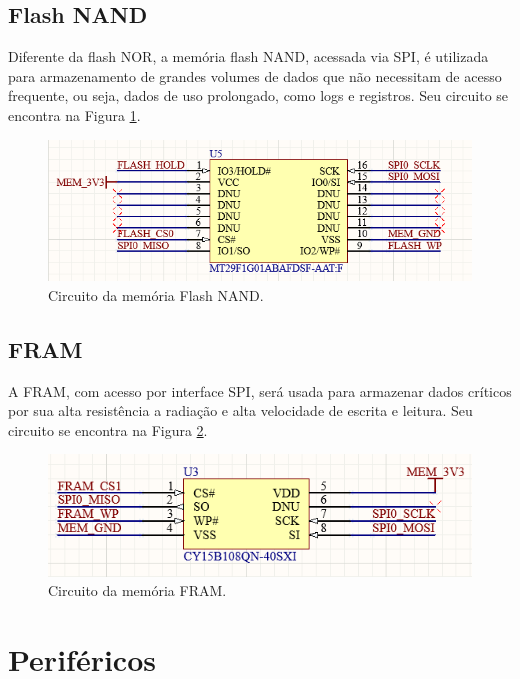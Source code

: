 \subsection{Flash NAND}

Diferente da flash NOR, a memória flash NAND, acessada via SPI, é utilizada para armazenamento de grandes volumes de dados que não necessitam de acesso frequente, ou seja, dados de uso prolongado, como logs e registros. Seu circuito se encontra na Figura \ref{fig:fnand}.

\begin{figure}[H]
    \centering
    \includegraphics[scale=0.7]{images/flash nand.png}
    \caption{Circuito da memória Flash NAND.}
    \label{fig:fnand}
\end{figure}

\subsection{FRAM}

 A FRAM, com acesso por interface SPI, será usada para armazenar dados críticos por sua alta resistência a radiação e alta velocidade de escrita e leitura. Seu circuito se encontra na Figura \ref{fig:fram}.

\begin{figure}[H]
    \centering
    \includegraphics[scale=0.7]{images/fram.png}
    \caption{Circuito da memória FRAM.}
    \label{fig:fram}
\end{figure}

\section{Periféricos}

